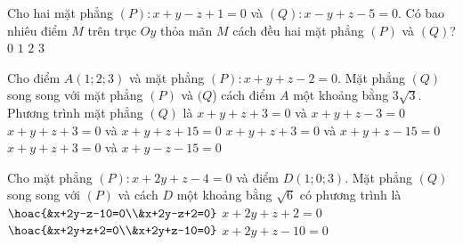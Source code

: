\begin{ex}%
	Cho hai mặt phẳng $(P) \colon x+y-z+1=0$ và $(Q) \colon x-y+z-5=0.$ Có bao nhiêu điểm $M$ trên trục $Oy$ thỏa mãn $M$ cách đều hai mặt phẳng $(P)$ và $(Q)$?
	\choice
	{$0$}
	{\True $1$}
	{$2$}
	{$3$}
\end{ex}
\begin{ex}%
	Cho điểm $A(1;2;3)$ và mặt phẳng $(P)\colon x+y+z-2=0$. Mặt phẳng $(Q)$ song song với mặt phẳng $(P)$ và $(Q$) cách điểm $A$ một khoảng bằng $3\sqrt{3}$. Phương trình mặt phẳng $(Q)$ là
	\choice
	{$x+y+z+3=0$ và $x+y+z-3=0$}
	{$x+y+z+3=0$ và $x+y+z+15=0$}
	{\True $x+y+z+3=0$ và $x+y+z-15=0$}
	{$x+y+z+3=0$ và $x+y-z-15=0$}
\end{ex}
\begin{ex}
	Cho mặt phẳng $ (P)\colon x+2y+z-4=0 $ và điểm $ D(1;0;3) $. Mặt phẳng $ (Q) $ song song với $ (P) $ và cách $ D $ một khoảng bằng $ \sqrt{6} $ có phương trình là
	\choice
	{$ \hoac{&x+2y-z-10=0\\&x+2y-z+2=0} $}
	{$ x+2y+z+2=0 $}
	{\True $ \hoac{&x+2y+z+2=0\\&x+2y+z-10=0} $}
	{$ x+2y+z-10=0 $}
\end{ex}

